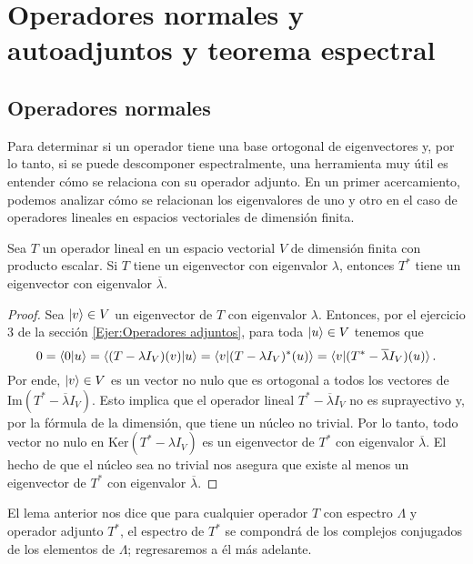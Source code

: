 \documentclass[12pt,dvipsnames]{article}
\newenvironment{lema}[2][Lema]{\begin{trivlist}
\item[\hskip \labelsep {\bfseries #1}\hskip \labelsep {\bfseries #2.}]}{\end{trivlist}}
\begin{document}
\newpage
\section{Operadores normales y autoadjuntos y teorema espectral} \label{Sec:15} 

\subsection{Operadores normales} \label{Ssec:Operadores normales}

Para determinar si un operador tiene una base ortogonal de eigenvectores y, por lo tanto, si se puede descomponer espectralmente, una herramienta muy útil es entender cómo se relaciona con su operador adjunto. En un primer acercamiento, podemos analizar cómo se relacionan los eigenvalores de uno y otro en el caso de operadores lineales en  espacios vectoriales de dimensión finita.

\begin{lema} {15.1.1} \label{Lema: 15.1.1}
    Sea $T$ un operador lineal en un espacio vectorial $V$ de dimensión finita con producto escalar. Si $T$ tiene un eigenvector con eigenvalor $\lambda$, entonces $T^*$ tiene un eigenvector con eigenvalor $\overline{\lambda}$.

    \begin{proof}
        Sea $\ket{v}\in V$ un eigenvector de $T$ con eigenvalor $\lambda$. Entonces, por el ejercicio 3 de la sección \ref{Ejer:Operadores adjuntos}, para toda $\ket{u}\in V$ tenemos que \[
            0=\braket{0|u}=\braket{(T-\lambda I_V)(v)|u}=\braket{v|(T-\lambda I_V)^*(u)}=\braket{v|(T^*-\overline{\lambda}I_V)(u)}.
        \] Por ende, $\ket{v}\in V$ es un vector no nulo que es ortogonal a todos los vectores de $\text{Im}(T^*-\overline{\lambda}I_V)$. Esto implica que el operador lineal $T^*-\overline{\lambda}I_V$ no es suprayectivo y, por la fórmula de la dimensión, que tiene un núcleo no trivial. Por lo tanto, todo vector no nulo en $\text{Ker}(T^*-\lambda I_V)$ es un eigenvector de $T^*$ con eigenvalor $\overline{\lambda}$. El hecho de que el núcleo sea no trivial nos asegura que existe al menos un eigenvector de $T^*$ con eigenvalor $\overline{\lambda}$.
    \end{proof}
\end{lema}

El lema anterior nos dice que para cualquier operador $T$ con espectro $\Lambda$ y operador adjunto $T^*$, el espectro de $T^*$ se compondrá de los complejos conjugados de los elementos de $\Lambda$; regresaremos a él más adelante.
\end{document}
